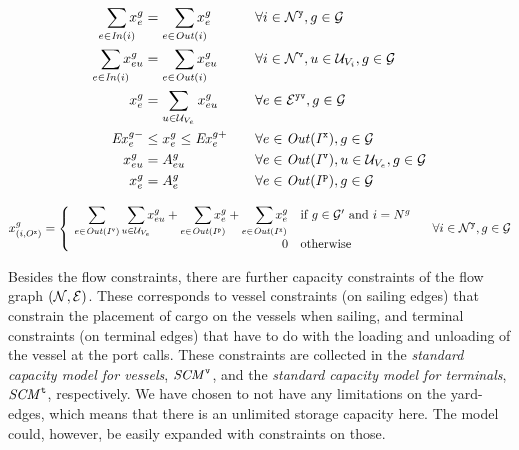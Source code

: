 \begin{alignat}{5}    
\label{OnOff}
\so[r]{\sum_{e\in \mi{In}(i)}} x^{g}_{e}	&= \so[r]{\sum_{e\in \mi{Out}(i)}}x^{g}_{e} &&\forall i\in \mc{N}^\ttt{y}, g\in \mc{G}\\
%
\label{secOnOff}
\so[r]{\sum_{e\in \mi{In}(i)}} x^{g}_{eu}	&= \so[r]{\sum_{e\in \mi{Out}(i)}}x^{g}_{eu}&& \forall i\in \mc{N}^\ttt{v}, u\in \mc{U}_{V_i}, g\in \mc{G} \\
%
\label{sumVars1}
x^g_{e} 																	&= \sum_{u\in \mc{U}_{V_e}} x^{g}_{eu}			&& \forall e\in \mc{E}^\ttt{yv}, g\in\mc{G}\\
%
\label{exportLimits} \mi{Ex}^{g-}_e				&\leq x^g_{e}\leq \mi{Ex}^{g+}_e\quad				&& \forall e\in \mi{Out}(I^\ttt{x}), g\in \mc{G} \\
\label{onboard} 			x^{g}_{eu} 					&= A^{g}_{eu}																&& \forall e\in\mi{Out}(I^\ttt{v}), u\in \mc{U}_{V_e}, g\in \mc{G}\\
\label{sourceYard} 		x^g_{e} 						&= A^g_{e}																	&& \forall e\in \mi{Out}(I^\ttt{p}), g\in \mc{G}
\end{alignat}

\begin{equation}\label{sinks}
x^g_{(i,O^\ttt{x})} = 
\left\{\begin{array}{rl}
		\quad\so[l]{\sum_{e\in\mi{Out}(I^\ttt{v})}}\so[r]{\sum_{u\in\mc{U}_{V_e}}} x^g_{eu} + \so[r]{\sum_{e\in \mi{Out}(I^\ttt{p})}} x^g_e + \so[r]{\sum_{e\in \mi{Out}(I^\ttt{x})}} x^g_{e}							 							 & \text{if } g\in \mc{G}' \text{ and } i = N^g\\
													0	& \text{otherwise}\end{array}\right.				
\quad \forall i\in \mc{N}^\ttt{y}, g\in\mc{G}
\end{equation}

Besides the flow constraints, there are further capacity constraints of the flow graph $(\mathcal{N},\mathcal{E})$. These corresponds to vessel constraints (on sailing edges) that constrain the placement of cargo on the vessels when sailing, and terminal constraints (on terminal edges) that have to do with the loading and unloading of the vessel at the port calls. These constraints are collected in the \emph{standard capacity model for vessels}, $\mathit{SCM}^\texttt{v}$, and the \emph{standard capacity model for terminals}, $\mathit{SCM}^\texttt{t}$, respectively. We have chosen to not have any limitations on the yard-edges, which means that there is an unlimited storage capacity here. The model could, however, be easily expanded with constraints on those. 

